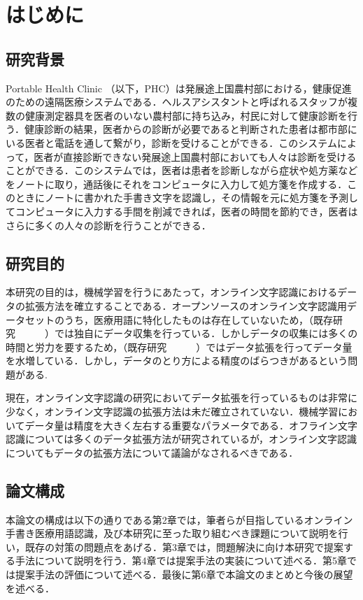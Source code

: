 
\chapter{はじめに}
\label{cha:intro}
\section{研究背景}
\label{sec:background}
Portable Health Clinic （以下，PHC）は発展途上国農村部における，健康促進のための遠隔医療システムである\cite{ahmed15:portable}．ヘルスアシスタントと呼ばれるスタッフが複数の健康測定器具を医者のいない農村部に持ち込み，村民に対して健康診断を行う．健康診断の結果，医者からの診断が必要であると判断された患者は都市部にいる医者と電話を通して繋がり，診断を受けることができる．このシステムによって，医者が直接診断できない発展途上国農村部においても人々は診断を受けることができる．このシステムでは，医者は患者を診断しながら症状や処方薬などをノートに取り，通話後にそれをコンピュータに入力して処方箋を作成する．このときにノートに書かれた手書き文字を認識し，その情報を元に処方箋を予測してコンピュータに入力する手間を削減できれば，医者の時間を節約でき，医者はさらに多くの人々の診断を行うことができる．

\section{研究目的}
本研究の目的は，機械学習を行うにあたって，オンライン文字認識におけるデータの拡張方法を確立することである．オープンソースのオンライン文字認識用データセットのうち，医療用語に特化したものは存在していないため，（既存研究　　　）では独自にデータ収集を行っている．しかしデータの収集には多くの時間と労力を要するため，（既存研究　　　）ではデータ拡張を行ってデータ量を水増している．しかし，データのとり方による精度のばらつきがあるという問題がある.

現在，オンライン文字認識の研究においてデータ拡張を行っているものは非常に少なく，オンライン文字認識の拡張方法は未だ確立されていない．機械学習においてデータ量は精度を大きく左右する重要なパラメータである．オフライン文字認識については多くのデータ拡張方法が研究されているが，オンライン文字認識についてもデータの拡張方法について議論がなされるべきである．


\section{論文構成}
本論文の構成は以下の通りである第2章では，筆者らが目指しているオンライン手書き医療用語認識，及び本研究に至った取り組むべき課題について説明を行い，既存の対策の問題点をあげる．第3章では，問題解決に向け本研究で提案する手法について説明を行う．第4章では提案手法の実装について述べる．第5章では提案手法の評価について述べる．最後に第6章で本論文のまとめと今後の展望を述べる．
